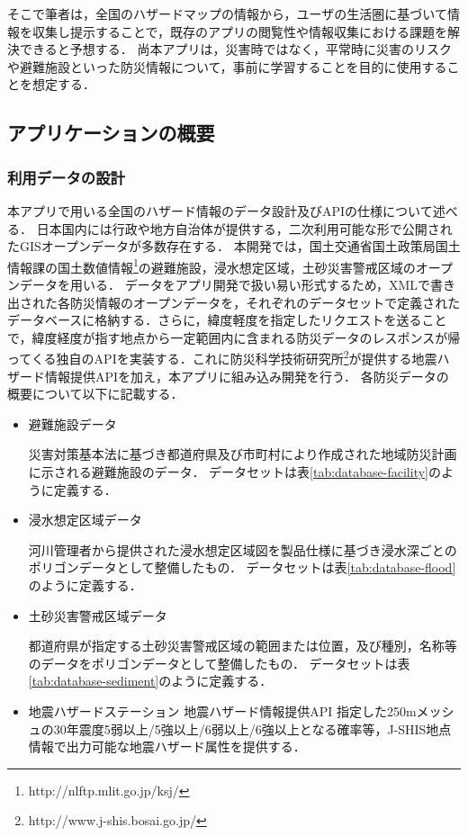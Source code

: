 \documentclass[a4paper]{jsarticle}
\begin{document}
そこで筆者は，全国のハザードマップの情報から，ユーザの生活圏に基づいて情報を収集し提示することで，既存のアプリの閲覧性や情報収集における課題を解決できると予想する．
尚本アプリは，災害時ではなく，平常時に災害のリスクや避難施設といった防災情報について，事前に学習することを目的に使用することを想定する．


\subsection{アプリケーションの概要}

\subsubsection{利用データの設計}
本アプリで用いる全国のハザード情報のデータ設計及びAPIの仕様について述べる．
日本国内には行政や地方自治体が提供する，二次利用可能な形で公開されたGISオープンデータが多数存在する．
本開発では，国土交通省国土政策局国土情報課の国土数値情報\footnote{http://nlftp.mlit.go.jp/ksj/}の避難施設，浸水想定区域，土砂災害警戒区域のオープンデータを用いる．
データをアプリ開発で扱い易い形式するため，XMLで書き出された各防災情報のオープンデータを，それぞれのデータセットで定義されたデータベースに格納する．さらに，緯度軽度を指定したリクエストを送ることで，緯度経度が指す地点から一定範囲内に含まれる防災データのレスポンスが帰ってくる独自のAPIを実装する．これに防災科学技術研究所\footnote{http://www.j-shis.bosai.go.jp/}が提供する地震ハザード情報提供APIを加え，本アプリに組み込み開発を行う．
各防災データの概要について以下に記載する．

\begin{itemize}
  \item 避難施設データ

  災害対策基本法に基づき都道府県及び市町村により作成された地域防災計画に示される避難施設のデータ．
  データセットは表\ref{tab:database-facility}のように定義する．

  \item 浸水想定区域データ

  河川管理者から提供された浸水想定区域図を製品仕様に基づき浸水深ごとのポリゴンデータとして整備したもの．
  データセットは表\ref{tab:database-flood}のように定義する．

  \item 土砂災害警戒区域データ

  都道府県が指定する土砂災害警戒区域の範囲または位置，及び種別，名称等のデータをポリゴンデータとして整備したもの．
  データセットは表\ref{tab:database-sediment}のように定義する．

  \item 地震ハザードステーション 地震ハザード情報提供API
  指定した250mメッシュの30年震度5弱以上/5強以上/6弱以上/6強以上となる確率等，J-SHIS地点情報で出力可能な地震ハザード属性を提供する．

\end{itemize}
\end{document}
